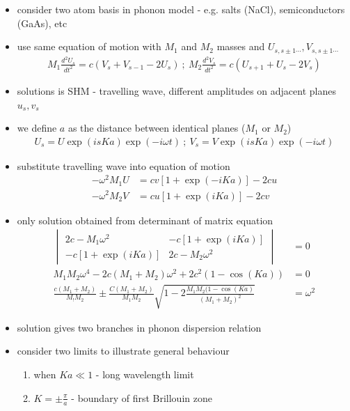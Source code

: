 \documentclass[a4paper,11pt,normalem]{article}
\begin{document}
\begin{itemize}
    \item consider two atom basis in phonon model - e.g. salts (NaCl), semiconductors (GaAs), etc
    \item use same equation of motion with \(M_1\) and \(M_2\) masses and \(U_{s,s\pm1\cdots},V_{s,s\pm1\cdots}\)
        \begin{align*}
            M_1\frac{d^2U_s}{dt^2} = c(V_s + V_{s-1} - 2U_s) ~;~ M_2\frac{d^2 V_s}{dt^2} = c(U_{s+1} + U_s - 2V_s)
        \end{align*}
    \item solutions is SHM - travelling wave, different amplitudes on adjacent planes \(u_s,v_s\)
    \item we define \(a\) as the distance between identical planes (\(M_1\) or \(M_2\))
        \begin{align*}
            U_s = U\exp(isKa)\exp(-i\omega t) ~;~ V_s = V\exp(isKa)\exp(-i\omega t)
        \end{align*}
    \item substitute travelling wave into equation of motion
        \begin{align*}
            -\omega^2 M_1U &= cv[1+\exp(-iKa)] - 2cu \\
            -\omega^2 M_2V &= cu[1+\exp(iKa)] - 2cv
        \end{align*}
    \item only solution obtained from determinant of matrix equation
        \begin{align*}
            \begin{vmatrix} 2c - M_1\omega^2 & -c[1+\exp(iKa)] \\ -c[1+\exp(iKa)] & 2c - M_2\omega^2 \end{vmatrix} &= 0 \\
            M_1M_2\omega^4 -2c(M_1+M_2)\omega^2 + 2c^2(1-\cos(Ka)) &= 0 \\
            \frac{c(M_1+M_2)}{M_!M_2} \pm \frac{C(M_1+M_2)}{M_1M_2}\sqrt{1 - 2\frac{M_1M_2(1-\cos(Ka)}{(M_1+M_2)^2}} &= \omega^2
        \end{align*}
    \item solution gives two branches in phonon dispersion relation
    \item consider two limits to illustrate general behaviour
        \begin{enumerate}
            \item when \(Ka \ll 1\) - long wavelength limit
            \item \(K = \pm\frac{\pi}{a}\) - boundary of first Brillouin zone

\end{enumerate}
\end{itemize}
\end{document}
